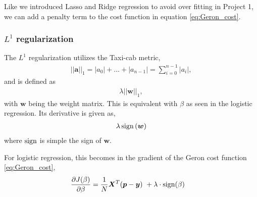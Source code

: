 Like we introduced Lasso and Ridge regression to avoid over fitting in Project 1, we can add a penalty term to the cost function in equation \eqref{eq:Geron_cost}.

\subsubsection{\texorpdfstring{$L^1$}{L1} regularization}
The $L^1$ regularization utilizes the Taxi-cab metric, 
\begin{align*}
    ||\bm{a}||_1 = |a_0| + \dots + |a_{n-1}| = \sum^{n-1}_{i=0}|a_i|,
\end{align*}
and is defined as 
\begin{align}
    \lambda||\bm{w}||_1,
    \label{eq:l1-reg}
\end{align}
with $\bm{w}$ being the weight matrix. This is equivalent with $\beta$ as seen in the logistic regression. Its derivative is given as,
\begin{align}
    \lambda \operatorname{sign}{(\bm{w})}
    \label{eq:l1-reg-derivative}
\end{align}
where $\operatorname{sign}$ is simple the sign of $\bm{w}$.

For logistic regression, this becomes in the gradient of the Geron cost function \eqref{eq:Geron_cost},
\begin{align}
    \frac{\partial J(\beta)}{\partial \beta} &=\frac{1}{N}\bm{X}^T(\bm{p}-\bm{y})\ + \lambda\cdot{\operatorname{sign}(\beta)}
    \label{eq:geron-cost-l1}
\end{align}


